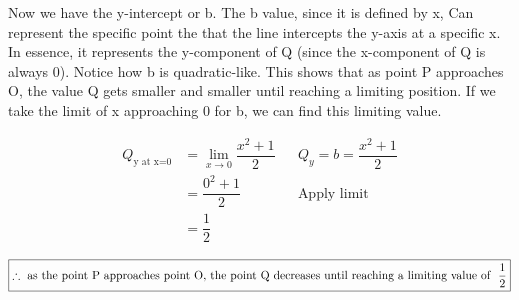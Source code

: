 \documentclass[12pt]{book}
\begin{document}
\begin{enumerate}
\newpage

\vspace{0.3cm}
Now we have the y-intercept or b. The b value, since it is defined by x, Can 
represent the specific point the that the line intercepts the y-axis at a specific x. 
In essence, it represents the y-component of Q (since the x-component of Q is always 0). 
Notice how b is quadratic-like. This shows that as point P approaches O, the value 
Q gets smaller and smaller until reaching a limiting position. If we take the limit 
of x approaching 0 for b, we can find this limiting value.

\addtolength{\jot}{-0.2em}
\begin{align*}
    Q_{\text{y at x=0}} &= \lim_{x \to 0} \dfrac{x^2 + 1}{2} && Q_y = b = \dfrac{x^2 + 1}{2}\\
    &= \dfrac{0^2 + 1}{2} && \text{Apply limit} \\
    &= \dfrac{1}{2}
\end{align*}

$$\boxed{\therefore \text{ as the point P approaches point O, the point Q decreases until reaching a limiting value of \space} \dfrac{1}{2}}$$

\end{enumerate}
\end{document}
